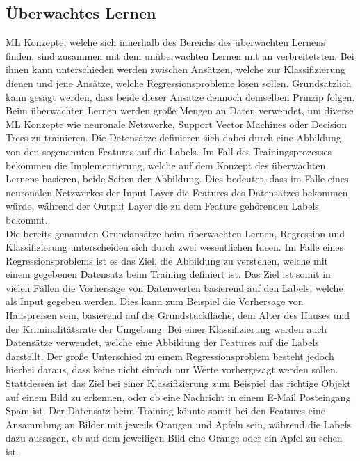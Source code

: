 \documentclass[]{iat}
\begin{document}
\subsection{Überwachtes Lernen} \label{sec:ueberwachtes_lernen}
ML Konzepte, welche sich innerhalb des Bereichs des überwachten Lernens finden, sind zusammen mit dem unüberwachten Lernen mit an verbreitetsten. Bei ihnen kann unterschieden werden zwischen Ansätzen, welche zur Klassifizierung dienen und jene Ansätze, welche Regressionsprobleme lösen sollen. Grundsätzlich kann gesagt werden, dass beide dieser Ansätze dennoch demselben Prinzip folgen. Beim überwachten Lernen werden große Mengen an Daten verwendet, um diverse ML Konzepte wie neuronale Netzwerke, Support Vector Machines oder Decision Trees zu trainieren. Die Datensätze definieren sich dabei durch eine Abbildung von den sogenannten Features auf die Labels. Im Fall des Trainingsprozesses bekommen die Implementierung, welche auf dem Konzept des überwachten Lernens basieren, beide Seiten der Abbildung. Dies bedeutet, dass im Falle eines neuronalen Netzwerkes der Input Layer die Features des Datensatzes bekommen würde, während der Output Layer die zu dem Feature gehörenden Labels bekommt.\\
Die bereits genannten Grundansätze beim überwachten Lernen, Regression und Klassifizierung unterscheiden sich durch zwei wesentlichen Ideen. Im Falle eines Regressionsproblems ist es das Ziel, die Abbildung zu verstehen, welche mit einem gegebenen Datensatz beim Training definiert ist. Das Ziel ist somit in vielen Fällen die Vorhersage von Datenwerten basierend auf den Labels, welche als Input gegeben werden. Dies kann zum Beispiel die Vorhersage von Hauspreisen sein, basierend auf die Grundstückfläche, dem Alter des Hauses und der Kriminalitätsrate der Umgebung. Bei einer Klassifizierung werden auch Datensätze verwendet, welche eine Abbildung der Features auf die Labels darstellt. Der große Unterschied zu einem Regressionsproblem besteht jedoch hierbei daraus, dass keine nicht einfach nur Werte vorhergesagt werden sollen. Stattdessen ist das Ziel bei einer Klassifizierung zum Beispiel das richtige Objekt auf einem Bild zu erkennen, oder ob eine Nachricht in einem E-Mail Posteingang Spam ist. Der Datensatz beim Training könnte somit bei den Features eine Ansammlung an Bilder mit jeweils Orangen und Äpfeln sein, während die Labels dazu aussagen, ob auf dem jeweiligen Bild eine Orange oder ein Apfel zu sehen ist. \cite[]{murphy2012machine} \cite[]{FrocMasc2021}
\end{document}
